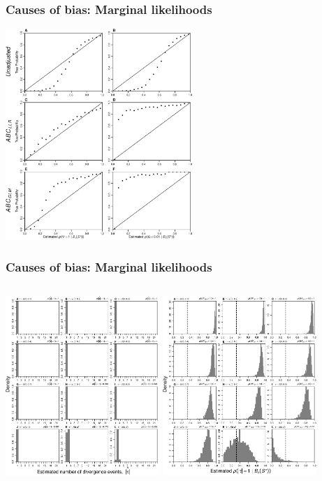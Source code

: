 \begin{frame}
    \frametitle{Causes of bias: Marginal likelihoods}
    \centerline{
    \includegraphics[height=8cm]{images/posterior_vs_true_prob.pdf}}
\end{frame}

\begin{frame}
    \frametitle{Causes of bias: Marginal likelihoods}
    \begin{columns}[c]
            \includegraphics[height=6.8cm]{images/SS_power_psi_modes_inform10.pdf}
            \includegraphics[height=6.8cm]{images/SS_power_psi_probs_inform10.pdf}
    \end{columns}
\end{frame}

